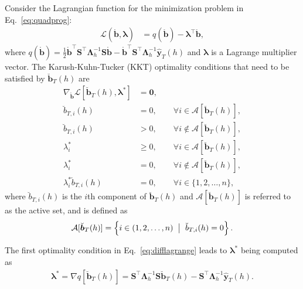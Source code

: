 \documentclass[11pt]{article}
\newcommand{\0}{\phantom{0}}
\begin{document}
Consider the Lagrangian function for the minimization problem in Eq.~\eqref{eq:quadprog}:
\begin{align*}
	\mathcal{L}(\mathring{\bm{b}}, \bm{\lambda}) & = q(\mathring{\bm{b}}) - \bm{\lambda}^\top\mathring{\bm{b}},
\end{align*}
where $q(\mathring{\bm{b}}) = \frac{1}{2}\mathring{\bm{b}}^\top\bm{S}^\top\bm{\Lambda}^{-1}_{h}\bm{S}\mathring{\bm{b}} - \mathring{\bm{b}}^\top\bm{S}^\top\bm{\Lambda}^{-1}_{h}\hat{\bm{y}}_{T}(h)$ and $\bm{\lambda}$ is a Lagrange multiplier vector. The Karush-Kuhn-Tucker (KKT) optimality conditions that need to be satisfied by $\breve{\bm{b}}_{T}(h)$ are
\begin{subequations}
	\label{eq:optcond}
	\begin{align}
		\label{eq:difflagrange}
		\nabla_{\mathring{\bm{b}}} \mathcal{L}[\breve{\bm{b}}_{T}(h), \bm{\lambda}^{*}] & = \bm{0},                                                          \\
		\breve{b}_{T, i}(h)                                                  & = 0, \qquad \forall i \in \mathcal{A}[\breve{\bm{b}}_{T}(h)],      \\
		\breve{b}_{T, i}(h)                                                  & > 0, \qquad \forall i \notin \mathcal{A}[\breve{\bm{b}}_{T}(h)],   \\
		\lambda^{*}_{i}                                                      & \geq 0, \qquad \forall i \in \mathcal{A}[\breve{\bm{b}}_{T}(h)],   \\
		\lambda^{*}_{i}                                                      & = 0, \qquad \forall i \notin \mathcal{A}[\breve{\bm{b}}_{T}(h)],   \\
		\lambda_{i}^{*} \breve{b}_{T, i}(h)                                  & = 0, \qquad \forall i \in \{1, 2, \dots, n\}, \label{eq:kktcomple}
	\end{align}
\end{subequations}
where $\breve{b}_{T, i}(h)$ is the $i$th component of $\breve{\bm{b}}_{T}(h)$ and $\mathcal{A}[\breve{\bm{b}}_{T}(h)]$ is referred to as the active set, and is defined as
\begin{align*}
	\mathcal{A}[\breve{\bm{b}}_{T}(h)] = \left\{i \in (1, 2, \dots, n) \hspace*{2mm} \big|\hspace*{2mm} \breve{b}_{T, i}(h) = 0\right\}.
\end{align*}

The first optimality condition in Eq.~\eqref{eq:difflagrange} leads to $\bm{\lambda}^{*}$ being computed as
\begin{align*}
	\bm{\lambda}^{*} = \nabla q[\breve{\bm{b}}_{T}(h)] = \bm{S}^\top\bm{\Lambda}^{-1}_{h}\bm{S}\breve{\bm{b}}_{T}(h) - \bm{S}^\top\bm{\Lambda}^{-1}_{h}\hat{\bm{y}}_{T}(h).
\end{align*}
\end{document}

